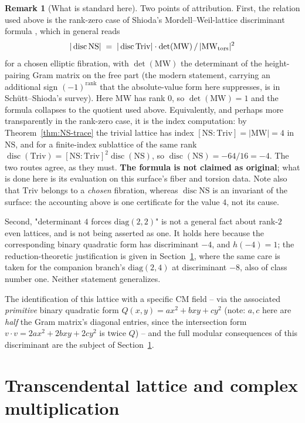\documentclass[11pt]{amsart}
\theoremstyle{definition}
\newtheorem{remark}[theorem]{Remark}
\newcommand{\Triv}{\mathrm{Triv}}
\newcommand{\NS}{\mathrm{NS}}
\DeclareMathOperator{\disc}{disc}
\begin{document}
\begin{remark}[What is standard here]
\label{rem:disc-standard}
Two points of attribution. First, the relation used above is the
rank-zero case of Shioda's Mordell--Weil-lattice discriminant formula
\cite{Shioda1990}, which in general reads
\[
  |\disc\NS| \;=\; |\disc\Triv|\cdot\det(\mathrm{MW})\,/\,
  |\mathrm{MW}_{\rm tors}|^2
\]
for a chosen elliptic fibration, with $\det(\mathrm{MW})$ the determinant
of the height-pairing Gram matrix on the free part (the modern statement,
carrying an additional sign $(-1)^{\operatorname{rank}}$ that the
absolute-value form here suppresses, is in Sch\"utt--Shioda's survey).
Here $\mathrm{MW}$ has rank $0$, so $\det(\mathrm{MW})=1$ and the formula
collapses to the quotient used above. Equivalently, and perhaps more
transparently in the rank-zero case, it is the index computation: by
Theorem~\ref{thm:NS-trace} the trivial lattice has index
$[\NS:\Triv]=|\mathrm{MW}|=4$ in $\NS$, and for a finite-index sublattice
of the same rank $\disc(\Triv)=[\NS:\Triv]^2\disc(\NS)$, so
$\disc(\NS)=-64/16=-4$. The two routes agree, as they must.
\textbf{The formula is not claimed as original}; what is done here is its
evaluation on this surface's fiber and torsion data. Note also that $\Triv$ belongs to a \emph{chosen}
fibration, whereas $\disc\NS$ is an invariant of the surface: the
accounting above is one certificate for the value $4$, not its cause.

Second, "determinant $4$ forces $\mathrm{diag}(2,2)$" is not a general
fact about rank-$2$ even lattices, and is not being asserted as one. It
holds here because the corresponding binary quadratic form has
discriminant $-4$, and $h(-4)=1$; the reduction-theoretic justification is
given in Section~\ref{sec:CM}, where the same care is taken for the
companion branch's $\mathrm{diag}(2,4)$ at discriminant $-8$, also of
class number one. Neither statement generalizes.
\end{remark}

The identification of this
lattice with a specific CM field -- via the associated \emph{primitive}
binary quadratic form $Q(x,y)=ax^2+bxy+cy^2$ (note: $a,c$ here are
\emph{half} the Gram matrix's diagonal entries, since the intersection
form $v\cdot v=2ax^2+2bxy+2cy^2$ is twice $Q$) -- and the full modular
consequences of this discriminant are the subject of
Section~\ref{sec:CM}.

\section{Transcendental lattice and complex multiplication}
\label{sec:CM}
\end{document}
